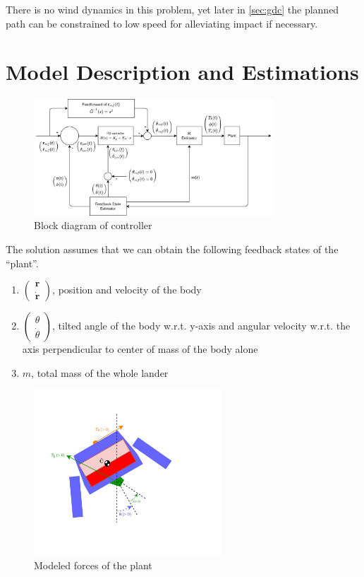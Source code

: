 \documentclass[notitlepage,twocolumn,10pt]{article}
\begin{document}
There is no wind dynamics in this problem, yet later in \cref{sec:gdc} the planned path can be constrained to low speed for alleviating impact if necessary.

\section{Model Description and Estimations}

\begin{figure}[H] %
    \centering
    \includegraphics[width=9.0cm, keepaspectratio]{PD_feedforward_block}
    \caption{Block diagram of controller}
    \label{fig:PD_feedforward_block}
\end{figure}

The solution assumes that we can obtain the following feedback states of the ``plant''.
\begin{enumerate}[label=\textbf{a.\arabic*}, itemsep=2pt] %
  \item \label{eqs:r} $\begin{pmatrix} \mathbf{r} \\ \dot{\mathbf{r}} \end{pmatrix}$, position and velocity of the body 
  \item \label{eqs:theta} $\begin{pmatrix} \theta \\ \dot{\theta} \end{pmatrix}$, tilted angle of the body w.r.t. y-axis and angular velocity w.r.t. the axis perpendicular to center of mass of the body alone
  \item \label{eqs:m} $m$, total mass of the whole lander
\end{enumerate}

\begin{figure}[H] %
    \centering
    \includegraphics[width=7.0cm, keepaspectratio]{model_forces}
    \caption{Modeled forces of the plant}
    \label{fig:model_forces}
\end{figure}
\end{document}
